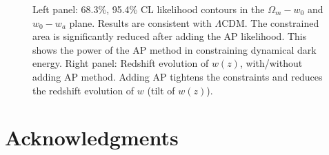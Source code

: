 \documentclass[useAMS,usenatbib]{mnras}
\begin{document}


\begin{figure}
   \caption{\label{fig_TpCF}
   Left panel: 68.3\%, 95.4\% CL likelihood contours in the $\Omega_m-w_0$ and $w_0-w_a$ plane.
   Results are consistent with $\Lambda$CDM.
   The constrained area is significantly reduced after adding the AP likelihood.
   This shows the power of the AP method in constraining dynamical dark energy.
   Right panel: Redshift evolution of $w(z)$, with/without adding AP method.
   Adding AP tightens the constraints and reduces the redshift evolution of $w$ (tilt of $w(z)$).
   }
\end{figure}




\section*{Acknowledgments}
\end{document}
